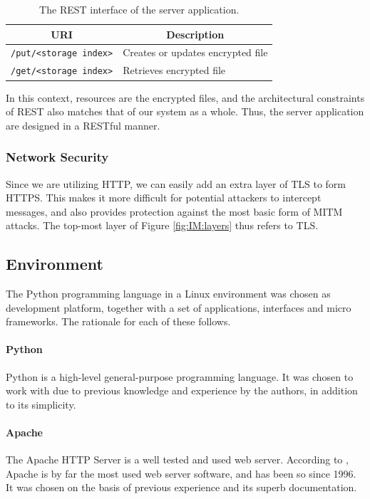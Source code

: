\documentclass[pdftex,english,10pt,b5paper,twoside]{book}
\begin{document}
\begin{table}[h!]
    \centering
    \caption{The \acs{REST} interface of the server application.}
    \begin{tabular}{|l|l|}
        \hline
        \multicolumn{1}{|c}{\textbf{\acs{URI}}} & \multicolumn{1}{|c|}{\textbf{Description}} \\
        \hline
        \texttt{/put/<storage index>} & Creates or updates encrypted file \\
        \hline
        \texttt{/get/<storage index>} & Retrieves encrypted file \\
        \hline
    \end{tabular}
    \label{tbl:IM:restinterface}
\end{table}

In this context, resources are the encrypted files, and the architectural
constraints of \ac{REST} also matches that of our system as a
whole. Thus, the server application are designed in a \acs{REST}ful manner.

\subsubsection{Network Security} Since we are utilizing \ac{HTTP}, we can easily
add an extra layer of \ac{TLS} to form \ac{HTTPS}. This makes it more difficult
for potential attackers to intercept messages, and also provides protection
against the most basic form of \ac{MITM} attacks. The top-most layer of Figure
\ref{fig:IM:layers} thus refers to \ac{TLS}.

\subsection{Environment}

The Python programming language in a Linux environment was chosen as development
platform, together with a set of applications, interfaces and micro frameworks.
The rationale for each of these follows.

\paragraph{Python} Python is a high-level general-purpose programming language.
It was chosen to work with due to previous knowledge and experience by the
authors, in addition to its simplicity.

\paragraph{Apache} The Apache HTTP Server is a well tested and used web
server. According to \citet{netcraft}, Apache is by far the most used web server
software, and has been so since 1996. It was chosen on the basis of previous
experience and its superb documentation.
\end{document}
